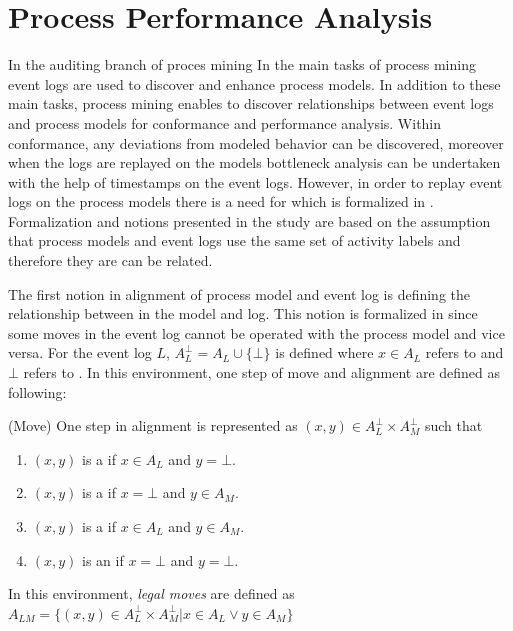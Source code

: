 \section{Process Performance Analysis}
\label{sec:process-performance-analysis}
In the auditing branch of proces mining 
In the main tasks of process mining event logs are used to discover and enhance process models. In addition to these main tasks, process mining enables to discover relationships between event logs and process models for conformance and performance analysis. Within conformance, any deviations from modeled behavior can be discovered, moreover when the logs are replayed on the models bottleneck analysis can be undertaken with the help of timestamps on the event logs. However, in order to replay event logs on the process models there is a need for  which is formalized in \cite{van2012replaying}. Formalization and notions presented in the study \cite{van2012replaying} are based on the assumption that process models and event logs use the same set of activity labels and therefore they are can be related.

The first notion in alignment of process model and event log is defining the relationship between  in the model and log. This notion is formalized in \cite{van2012replaying} since some moves in the event log cannot be operated with the process model and vice versa. For the event log $L$, $A_{L}^{\bot} = A_{L} \cup \{ \bot\}$ is defined where $x \in A_{L}$ refers to  and $\bot$ refers to . In this environment, one step of move and alignment are defined as following:

\theoremstyle{definition}
\begin{definition}{}
(Move) One step in alignment is represented as $(x,y) \in A_{L}^{\bot} \times A_{M}^{\bot}$ such that
\begin{enumerate}
  \item $(x,y)$ is a  if $ x \in A_{L}$ and $y=\bot$.
  \item $(x,y)$ is a  if $x=\bot$ and $y \in A_{M}$.
  \item $(x,y)$ is a  if $x \in A_{L}$ and $y \in A_{M}$.
  \item $(x,y)$ is an  if $x=\bot$ and $y=\bot$.
\end{enumerate}
In this environment, \textit{legal moves} are defined as $A_{LM} = \{ (x,y) \in A_{L}^{\bot} \times A_{M}^{\bot} |  x \in A_{L} \vee y \in A_{M} \}$
\end{definition}

